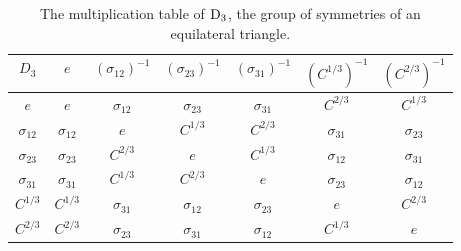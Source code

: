 \begin{table}[h]
  \caption[The multiplication table of  $\Dn{3}$]{
    The multiplication table of  $\Dn{3}$, the group of symmetries of an equilateral
    triangle.
  }
  \label{tab:D3MultTab}
  \begin{center}
    \centering
    \begin{tabular}{c | c c c c c c}
      $D_3$ & $e$ & $(\sigma_{12})^{-1}$ & $(\sigma_{23})^{-1}$ & $(\sigma_{31})^{-1}$
      & $(C^{1/3})^{-1}$ & $(C^{2/3})^{-1}$ \\ \hline
      $e$ & $e$ & $\sigma_{12}$ & $\sigma_{23}$ & $\sigma_{31}$  & $C^{2/3}$ & $C^{1/3}$\\
      $\sigma_{12}$ & $\sigma_{12}$ & $e$ & $C^{1/3}$ & $C^{2/3}$  & $\sigma_{31}$ & $\sigma_{23}$\\
      $\sigma_{23}$ & $\sigma_{23}$ & $C^{2/3}$ & $e$ & $C^{1/3}$  & $\sigma_{12}$ & $\sigma_{31}$\\
      $\sigma_{31}$ & $\sigma_{31}$ & $C^{1/3}$ & $C^{2/3}$ & $e$  & $\sigma_{23}$ & $\sigma_{12}$\\
      $C^{1/3}$ & $C^{1/3}$ & $\sigma_{31}$ & $\sigma_{12}$ & $\sigma_{23}$ & $e$ & $C^{2/3}$   \\
      $C^{2/3}$ & $C^{2/3}$ & $\sigma_{23}$ & $\sigma_{31}$ & $\sigma_{12}$ & $C^{1/3}$ & $e$
    \end{tabular}
  \end{center}
\end{table}

